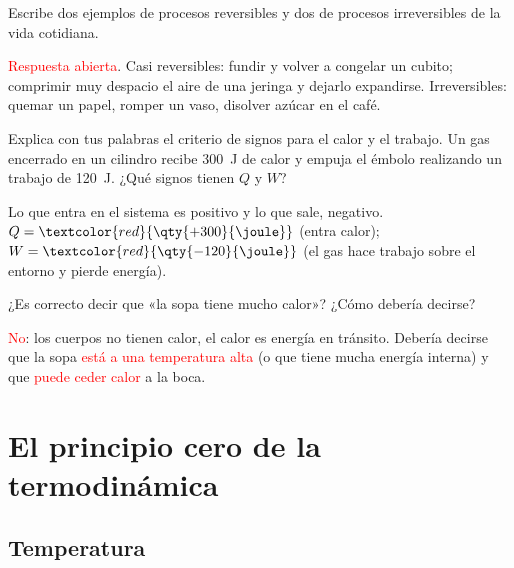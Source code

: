 \begin{exercise}
    Escribe dos ejemplos de procesos reversibles y dos de procesos irreversibles de la vida cotidiana.
    \begin{solu}
        \textcolor{red}{Respuesta abierta}. Casi reversibles: fundir y volver a congelar un cubito; comprimir muy despacio el aire
        de una jeringa y dejarlo expandirse. Irreversibles: quemar un papel, romper un vaso, disolver azúcar en el café.
    \end{solu}
\end{exercise}

\begin{exercise}
    Explica con tus palabras el criterio de signos para el calor y el trabajo. Un gas encerrado en un cilindro recibe
    \qty{300}{\joule} de calor y empuja el émbolo realizando un trabajo de \qty{120}{\joule}. ¿Qué signos tienen \(Q\) y \(W\)?
    \begin{solu}
        Lo que entra en el sistema es positivo y lo que sale, negativo. \(Q = \textcolor{red}{\qty{+300}{\joule}}\) (entra calor);
        \(W = \textcolor{red}{\qty{-120}{\joule}}\) (el gas hace trabajo sobre el entorno y pierde energía).
    \end{solu}
\end{exercise}

\begin{exercise}
    ¿Es correcto decir que «la sopa tiene mucho calor»? ¿Cómo debería decirse?
    \begin{solu}
        \textcolor{red}{No}: los cuerpos no tienen calor, el calor es energía en tránsito. Debería decirse que la sopa
        \textcolor{red}{está a una temperatura alta} (o que tiene mucha energía interna) y que \textcolor{red}{puede ceder calor}
        a la boca.
    \end{solu}
\end{exercise}

\section{El principio cero de la termodinámica}\label{sec:ud13-principio-cero}

\subsection{Temperatura}

